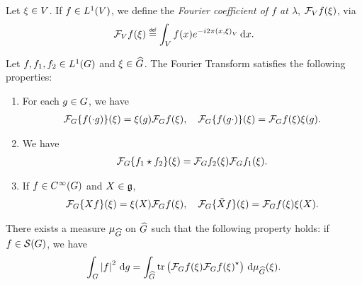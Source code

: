 \begin{definition}
    Let $\xi \in \VectorSpace$.
    If $f \in \Lebesgue{1}\VectorSpace$,
    we define the \emph{Fourier coefficient of $f$ at $\lambda$}, $\Fourier[\VectorSpace] f(\xi)$, via
    \begin{align*}
        \Fourier[\VectorSpace] f(\xi) \defeq \int_\VectorSpace f(x) \e^{-\i \turn \ip{x}\xi} \dd x.
    \end{align*}
\end{definition}

\begin{proposition}
\label{proposition:elementary_properties_of_the_Fourier_transform}
    Let $f, f_1, f_2 \in \Lebesgue{1}{\Group}$ and $\xi \in \dualGroup\Group$.
    The Fourier Transform satisfies the following properties:
    \begin{enumerate}
        \item For each $g \in \Group$, we have
            \begin{align*}
                \Fourier \{f(\dummy g)\} (\xi)
                = \xi(g) \Fourier f(\xi), \quad
                \Fourier \{f(g \dummy)\} (\xi)
                = \Fourier f(\xi) \xi(g).
            \end{align*}
        \item We have
            \begin{align*}
                \Fourier \{\conv{f_1}{f_2}\}(\xi)
                = \Fourier f_2(\xi) \Fourier f_1(\xi).
            \end{align*}
        \item If $f \in \SmoothFunctions\Group$ and $X \in \LieAlgebra$,
            \begin{align*}
                \Fourier \{\LeftDifferentialOperatorFirstOrder{X} f\}(\xi)
                = \xi(X) \Fourier f(\xi), \quad
                \Fourier \{\RightDifferentialOperatorFirstOrder{X} f\}(\xi)
                = \Fourier f(\xi) \xi(X).
            \end{align*}
    \end{enumerate}
\end{proposition}

\begin{proposition}
    There exists a measure $\Plancherel\Group$ on $\dualGroup\Group$ such that the following property holds:
    if $f \in \Schwartz\Group$, we have
    \begin{align*}
        \int_\Group \abs{f}^2 \dd g
        = \int_{\dualGroup\Group} \tr \left( \Fourier f(\xi) \adj{\Fourier f(\xi)} \right) \dd \Plancherel\Group(\xi).
    \end{align*}
\end{proposition}

